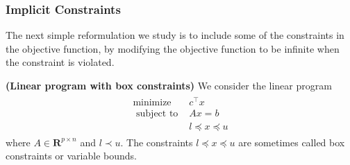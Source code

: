 \documentclass{article}
\newcommand{\bfs}[1]{\textbf{({#1}) }}
\begin{document}
\subsubsection{Implicit Constraints}
The next simple reformulation we study is to include some of the constraints in the objective function, by modifying the objective function to be infinite when the constraint is violated.

\begin{exma}\bfs{Linear program with box constraints}
We consider the linear program
\begin{align*}
\begin{array}{ll}
\operatorname{minimize} & c^{\top} x \\
\text { subject to } & A x=b \\
& l \preceq x \preceq u
\end{array}
\end{align*}
where $A \in \mathbf{R}^{p \times n}$ and $l \prec u$. The constraints $l \preceq x \preceq u$ are sometimes called box constraints or variable bounds.


\end{exma}
\end{document}
